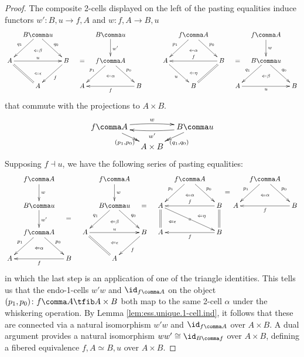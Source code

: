 \documentclass[12pt,reqno]{amsart}
\theoremstyle{plain}
\theoremstyle{definition}
\theoremstyle{remark}
\numberwithin{equation}{subsection}
\begin{document}
\begin{proof}
The composite 2-cells displayed on the left of the pasting equalities induce functors  $w'\colon B \comma u \to f \comma A$ and $w\colon f \comma A \to B \comma u$
\begin{equation*}\xymatrix@C=10pt{ & B \comma u \ar[dl]_{q_1} \ar[dr]^{q_0} \ar@{}[d]|(.6){\Leftarrow\beta} &  &  & B \comma u \ar[d]^{w'}  & && & f \comma A \ar[dl]_{p_1} \ar[dr]^{p_0} \ar@{}[d]|(.6){\Leftarrow\alpha} & & & f \comma A \ar[d]^{w}  \\ A \ar@{=}[dr] \ar[rr]^u & \ar@{}[d]|{\Leftarrow\epsilon} & B  \ar[dl]^f & = & f \comma A \ar[dl]_{p_1} \ar[dr]^{p_0} \ar@{}[d]|(.6){\Leftarrow\alpha} & & & A  \ar[dr]_u & \ar@{}[d]|{\Leftarrow\eta} & B \ar@{=}[dl] \ar[ll]_f & = & B \comma u \ar[dl]_{q_1} \ar[dr]^{q_0} \ar@{}[d]|(.6){\Leftarrow\beta}  \\ & A & & A  & & B \ar[ll]^f & & & B & & A \ar[rr]_u & & B}\end{equation*} 
that commute with the projections to $A \times B$.
\begin{equation*}
    \xymatrix@=1em{ f\comma A \ar@{->>}[dr]_{(p_1,p_0)} \ar@/^1ex/[rr]^{w} & & B \comma u \ar@{->>}[dl]^{(q_1,q_0)} \ar@/^1ex/[ll]^{w'} \\ & A \times B} 
\end{equation*}
Supposing $f \dashv u$, we have the following series of pasting equalities:
\begin{equation*}
\xymatrix@C=10pt{ & f \comma A \ar[d]^{w} & & & f \comma A \ar[d]^{w} & & & f \comma A \ar[dl]_{p_1} \ar[dr]^{p_0}\ar@{}[d]|(.6){\Leftarrow\alpha} & \ar@{}[dr]|*+{=} & & f \comma A  \ar[dl]_{p_1} \ar[dr]^{p_0} \ar@{}[d]|(.6){\Leftarrow\alpha} \\ & B \comma u \ar[d]^{w'} & \ar@{}[d]|*+{=} & & B \comma u \ar[dl]_{q_1} \ar[dr]^{q_0} \ar@{}[d]|(.6){\Leftarrow\beta}  & {=}  & A  \ar[drr]|u \ar@{=}[d] &\ar@{}[dr]|(.4){\Leftarrow\eta} & B \ar[ll]_f \ar@{=}[d]  & A & & B \ar[ll]^f \\ & f \comma A \ar[dl]_{p_1} \ar[dr]^{p_0} \ar@{}[d]|(.6){\Leftarrow\alpha} & & A \ar@{=}[dr] \ar[rr]^u & \ar@{}[d]|(0.4){\Leftarrow\epsilon}  & B  \ar[dl]^f  & A \ar@{}[ur]|(0.4){\Leftarrow\epsilon} &   & B \ar[ll]^f  \\ A & & B \ar[ll]^f & & A & & & &  }
\end{equation*} 
in which the last step is an application of one of the triangle identities.  This tells us that the endo-1-cells $w'w$ and $\id_{f\comma A}$ on the object $(p_1,p_0)\colon f\comma A\tfib A\times B$ both map to the same 2-cell $\alpha$ under the whiskering operation. By Lemma \ref{lem:ess.unique.1-cell.ind}, it follows that these are connected via a natural isomorphism  $w'w$ and $\id_{f\comma A}$ over $A \times B$. A dual argument provides a natural isomorphism $ww' \cong \id_{B \comma f}$ over $A \times B$, defining a fibered equivalence $f \comma A \simeq B \comma u$ over  $A\times B$.
\end{proof}
\end{document}
